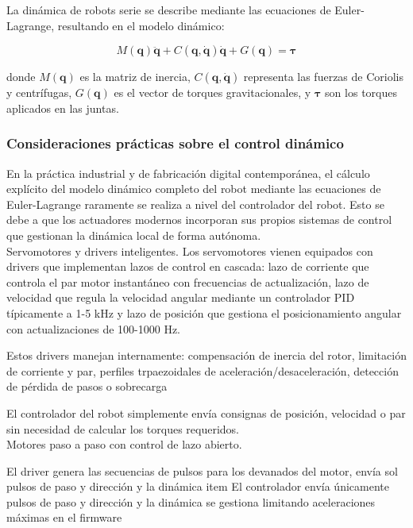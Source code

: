 La dinámica de robots serie se describe mediante las ecuaciones de Euler-Lagrange, resultando en el modelo dinámico:

\begin{equation}
M(\mathbf{q})\ddot{\mathbf{q}} + C(\mathbf{q}, \dot{\mathbf{q}})\dot{\mathbf{q}} + G(\mathbf{q}) = \boldsymbol{\tau}
\end{equation}

donde $M(\mathbf{q})$ es la matriz de inercia, $C(\mathbf{q}, \dot{\mathbf{q}})$ representa las fuerzas de Coriolis y centrífugas, $G(\mathbf{q})$ es el vector de torques gravitacionales, y $\boldsymbol{\tau}$ son los torques aplicados en las juntas.

\subsubsection{Consideraciones prácticas sobre el control dinámico}

En la práctica industrial y de fabricación digital contemporánea, el cálculo explícito del modelo dinámico completo del robot mediante las ecuaciones de Euler-Lagrange raramente se realiza a nivel del controlador del robot. Esto se debe a que los actuadores modernos incorporan sus propios sistemas de control que gestionan la dinámica local de forma autónoma.\\

Servomotores y drivers inteligentes. 
\noindent
Los servomotores vienen equipados con drivers que implementan lazos de control en cascada: lazo de corriente que controla el par motor instantáneo con frecuencias de actualización, lazo de velocidad que regula la velocidad angular mediante un controlador PID típicamente a 1-5 kHz y lazo de posición que gestiona el posicionamiento angular con actualizaciones de 100-1000 Hz.

Estos drivers manejan internamente: compensación de inercia del rotor, limitación de corriente y par, perfiles trpaezoidales de aceleración/desaceleración, detección de pérdida de pasos o sobrecarga

El controlador del robot simplemente envía consignas de posición, velocidad o par sin necesidad de calcular los torques requeridos.\\

Motores paso a paso con control de lazo abierto.

El driver genera las secuencias de pulsos para los devanados del motor, envía sol pulsos de paso y dirección y la dinámica item El controlador envía únicamente pulsos de paso y dirección y la dinámica se gestiona limitando aceleraciones máximas en el firmware

